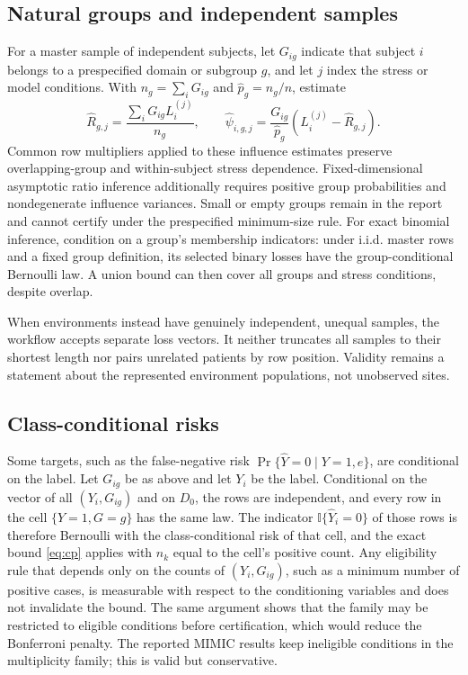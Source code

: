 \documentclass[twoside,11pt]{article}
\begin{document}
\subsection{Natural groups and independent samples}
\label{sec:natural-groups}
For a master sample of independent subjects, let $G_{ig}$ indicate that subject $i$ belongs to
a prespecified domain or subgroup $g$, and let $j$ index the stress or model conditions.
With $n_g=\sum_iG_{ig}$ and $\widehat p_g=n_g/n$, estimate
\begin{equation}
\widehat R_{g,j}=\frac{\sum_iG_{ig}L_i^{(j)}}{n_g},\qquad
\widehat\psi_{i,g,j}=\frac{G_{ig}}{\widehat p_g}
       (L_i^{(j)}-\widehat R_{g,j}).
\label{eq:group}
\end{equation}
Common row multipliers applied to these influence estimates preserve overlapping-group and
within-subject stress dependence. Fixed-dimensional asymptotic ratio inference additionally
requires positive group probabilities and nondegenerate influence variances. Small or empty
groups remain in the report and cannot certify under the prespecified minimum-size rule.
For exact binomial inference, condition on a group's membership indicators: under i.i.d.
master rows and a fixed group definition, its selected binary losses have the group-conditional
Bernoulli law. A union bound can then cover all groups and stress conditions, despite overlap.

When environments instead have genuinely independent, unequal samples, the workflow accepts
separate loss vectors. It neither truncates all samples to their shortest length nor pairs
unrelated patients by row position. Validity remains a statement about the represented
environment populations, not unobserved sites.

\subsection{Class-conditional risks}
\label{sec:classcond}
Some targets, such as the false-negative risk $\Pr\{\widehat Y=0\mid Y=1,e\}$, are
conditional on the label. Let $G_{ig}$ be as above and let $Y_i$ be the label. Conditional on
the vector of all $(Y_i,G_{ig})$ and on $D_0$, the rows are independent, and every row in the
cell $\{Y=1,G=g\}$ has the same law. The indicator $\mathbb I\{\widehat Y_i=0\}$ of those rows
is therefore Bernoulli with the class-conditional risk of that cell, and the exact bound
\eqref{eq:cp} applies with $n_k$ equal to the cell's positive count. Any eligibility rule that
depends only on the counts of $(Y_i,G_{ig})$, such as a minimum number of positive cases, is
measurable with respect to the conditioning variables and does not invalidate the bound.
The same argument shows that the family may be restricted to eligible conditions before
certification, which would reduce the Bonferroni penalty. The reported MIMIC results keep
ineligible conditions in the multiplicity family; this is valid but conservative.
\end{document}
